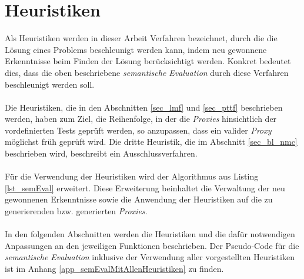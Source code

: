 
\section{Heuristiken}\label{sec_heuristics}
Als \Gls{Heuristik}en werden in dieser Arbeit Verfahren bezeichnet, durch die die Lösung eines Problems beschleunigt werden kann, indem neu gewonnene Erkenntnisse beim Finden der Lösung berücksichtigt werden. Konkret bedeutet dies, dass die oben beschriebene \emph{semantische Evaluation} durch diese Verfahren beschleunigt werden soll.
\\\\
Die \Gls{Heuristik}en, die in den Abschnitten \ref{sec_lmf} und \ref{sec_pttf} beschrieben werden, haben zum Ziel, die Reihenfolge, in der die \emph{Proxies} hinsichtlich der vordefinierten Tests geprüft werden, so anzupassen, dass ein valider \emph{Proxy} möglichst früh geprüft wird. Die dritte Heuristik, die im Abschnitt \ref{sec_bl_nmc} beschrieben wird, beschreibt ein Ausschlussverfahren.
\\\\
Für die Verwendung der \Gls{Heuristik}en wird der Algorithmus aus Listing \ref{lst_semEval} erweitert. Diese Erweiterung beinhaltet die Verwaltung der neu gewonnenen Erkenntnisse sowie die Anwendung der \Gls{Heuristik}en auf die zu generierenden bzw. generierten \emph{Proxies}. 
\\\\
In den folgenden Abschnitten werden die \Gls{Heuristik}en und die dafür notwendigen Anpassungen an den jeweiligen Funktionen beschrieben. Der Pseudo-Code für die \emph{semantische Evaluation} inklusive der Verwendung aller vorgestellten \Gls{Heuristik}en ist im Anhang \ref{app_semEvalMitAllenHeuristiken} zu finden.


